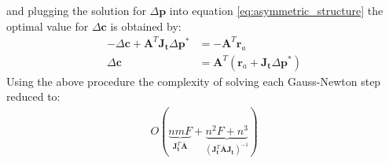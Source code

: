 and plugging the solution for $\Delta\mathbf{p}$ into equation \ref{eq:asymmetric_structure} the optimal value for $\Delta\mathbf{c}$ is obtained by:
\begin{equation}
    \begin{aligned}
        -\Delta \mathbf{c} + \mathbf{A}^T\mathbf{J}_{\mathbf{t}}\Delta\mathbf{p}^* & = -\mathbf{A}^T \mathbf{r}_a
        \\
        \Delta \mathbf{c} & = \mathbf{A}^T \left( \mathbf{r}_a + \mathbf{J}_{\mathbf{t}} \Delta\mathbf{p}^* \right)
    \label{eq:asymmetric_schur_solution2}
    \end{aligned}
\end{equation}
Using the above procedure the complexity of solving each Gauss-Newton step reduced to:
\begin{equation}
    \begin{aligned}
        O(
        \underbrace{nmF}_{\mathbf{J}_{\mathbf{t}}^T\bar{\mathbf{A}}}
        +
        \underbrace{n^2F + n^3}_{\left( \mathbf{J}_{\mathbf{t}}^T\bar{\mathbf{A}}\mathbf{J}_{\mathbf{t}} \right)^{-1}}
        )
    \label{eq:complexity_schur_asymmetric}
    \end{aligned}
\end{equation}

